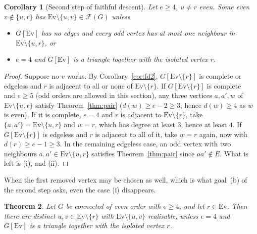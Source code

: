 \documentclass[11pt]{amsart}
\newtheorem{theorem}{Theorem}
\newtheorem{corollary}[theorem]{Corollary}
\theoremstyle{definition}
\newcommand{\cF}{\mathcal F}
\newcommand{\Ev}{\mathrm{Ev}}
\begin{document}
\begin{corollary}[Second step of faithful descent]\label{cor:fd2strong}
Let $e\ge4$, $u\ne r$ even. Some even $v\notin\{u,r\}$ has $\Ev\setminus\{u,v\}\in\cF(G)$ unless
\begin{itemize}
\item[(i)] $G[\Ev]$ has no edges and every odd vertex has at most one neighbour in
$\Ev\setminus\{u,r\}$, or
\item[(ii)] $e=4$ and $G[\Ev]$ is a triangle together with the isolated vertex $r$.
\end{itemize}
\end{corollary}

\begin{proof}
Suppose no $v$ works. By Corollary~\ref{cor:fd2}, $G[\Ev\setminus\{r\}]$ is complete or edgeless
and $r$ is adjacent to all or none of $\Ev\setminus\{r\}$. If $G[\Ev\setminus\{r\}]$ is complete
and $e\ge5$ (odd orders are allowed in this section), any three vertices $a,a',w$ of
$\Ev\setminus\{u,r\}$ satisfy Theorem~\ref{thm:pair} ($d(w)\ge e-2\ge3$, hence $d(w)\ge4$ as $w$
is even). If it is complete, $e=4$ and $r$ is adjacent to $\Ev\setminus\{r\}$, take
$\{a,a'\}=\Ev\setminus\{u,r\}$ and $w=r$, which has degree at least $3$, hence at least $4$. If
$G[\Ev\setminus\{r\}]$ is edgeless and $r$ is adjacent to all of it, take $w=r$ again, now with
$d(r)\ge e-1\ge3$. In the remaining edgeless case, an odd vertex with two neighbours
$a,a'\in\Ev\setminus\{u,r\}$ satisfies Theorem~\ref{thm:pair} since $aa'\notin E$. What is left is
(i), and (ii).
\end{proof}

When the first removed vertex may be chosen as well, which is what goal~(b) of the second step
asks, even the case (i) disappears.

\begin{theorem}\label{thm:b}
Let $G$ be connected of even order with $e\ge4$, and let $r\in\Ev$. Then there are distinct
$u,v\in\Ev\setminus\{r\}$ with $\Ev\setminus\{u,v\}$ realisable, unless $e=4$ and $G[\Ev]$ is a
triangle together with the isolated vertex $r$.
\end{theorem}
\end{document}
